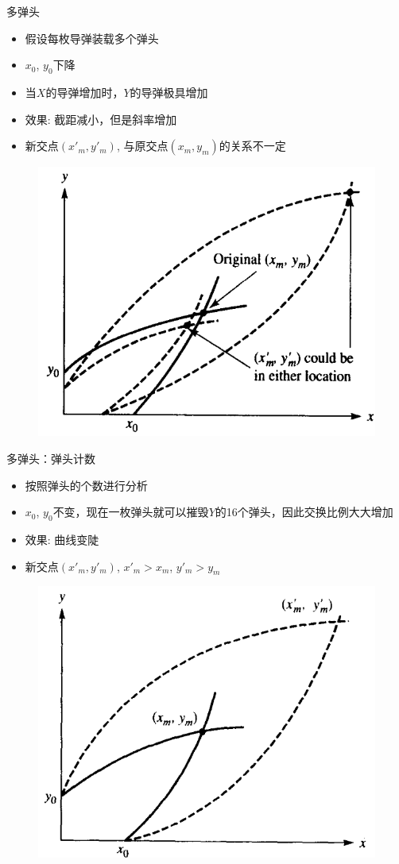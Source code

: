 \documentclass[mathserif, table]{beamer}
\begin{document}
\begin{frame}{多弹头}
  \begin{itemize}
  \item 假设每枚导弹装载多个弹头
  \item $x_0$, $y_0$下降
  \item 当$X$的导弹增加时，$Y$的导弹极具增加
  \item 效果: 截距减小，但是斜率增加
  \item 新交点$(x'_m, y'_m)$, 与原交点$(x_m, y_m)$的关系不一定
  \end{itemize}

  \begin{figure}
    \centering
    \includegraphics[width=.45\textwidth]{mw.png}
  \end{figure}
  
\end{frame}

\begin{frame}{多弹头：弹头计数}
  \begin{itemize}
  \item 按照弹头的个数进行分析
  \item $x_0$, $y_0$不变，现在一枚弹头就可以摧毁$Y$的16个弹头，因此交换比例大大增加
  \item 效果: 曲线变陡
  \item 新交点$(x'_m, y'_m)$, $x'_m > x_m$, $y'_m > y_m$
  \end{itemize}

  \begin{figure}
    \centering
    \includegraphics[width=.45\textwidth]{wc.png}
  \end{figure}
  
\end{frame}
\end{document}
